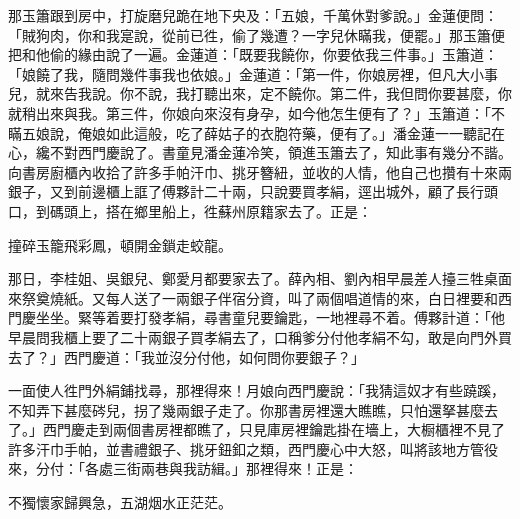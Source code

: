 那玉簫跟到房中，打旋磨兒跪在地下央及：「五娘，千萬休對爹說。」金蓮便問：「賊狗肉，你和我寔說，從前已徃，偷了幾遭？一字兒休瞞我，便罷。」那玉簫便把和他偷的緣由說了一遍。金蓮道：「既要我饒你，你要依我三件事。」玉簫道：「娘饒了我，隨問幾件事我也依娘。」金蓮道：「第一件，你娘房裡，但凡大小事兒，就來告我說。你不說，我打聽出來，定不饒你。第二件，我但問你要甚麼，你就稍出來與我。第三件，你娘向來沒有身孕，如今他怎生便有了？」{}玉簫道：「不瞞五娘說，俺娘如此這般，吃了薛姑子的衣胞符藥，便有了。」潘金蓮一一聽記在心，纔不對西門慶說了。書童見潘金蓮冷笑，領進玉簫去了，知此事有幾分不諧。向書房廚櫃內收拾了許多手帕汗巾、挑牙簪紐，並收的人情，他自己也攢有十來兩銀子，又到前邊櫃上誆了傅夥計二十兩，只說要買孝絹，逕出城外，顧了長行頭口，到碼頭上，搭在鄉里船上，徃蘇州原籍家去了。{}正是：

\begin{myquote} 
撞碎玉籠飛彩鳳，頓開金鎖走蛟龍。
\end{myquote} 

那日，李桂姐、吳銀兒、鄭愛月都要家去了。薛內相、劉內相早晨差人擡三牲桌面來祭奠燒紙。又每人送了一兩銀子伴宿分資，叫了兩個唱道情的來，白日裡要和西門慶坐坐。緊等着要打發孝絹，尋書童兒要鑰匙，一地裡尋不着。傅夥計道：「他早晨問我櫃上要了二十兩銀子買孝絹去了，口稱爹分付他孝絹不勾，敢是向門外買去了？」西門慶道：「我並沒分付他，如何問你要銀子？」

一面使人徃門外絹鋪找尋，那裡得來！月娘向西門慶說：「我猜這奴才有些蹺蹊，不知弄下甚麼硶兒，{}拐了幾兩銀子走了。你那書房裡還大瞧瞧，只怕還拏甚麼去了。」西門慶走到兩個書房裡都瞧了，只見庫房裡鑰匙掛在墻上，大橱櫃裡不見了許多汗巾手帕，並書禮銀子、挑牙鈕釦之類，西門慶心中大怒，叫將該地方管役來，分付：「各處三街兩巷與我訪緝。」那裡得來！正是：

\begin{myquote} 
不獨懷家歸興急，五湖烟水正茫茫。
\end{myquote} 

